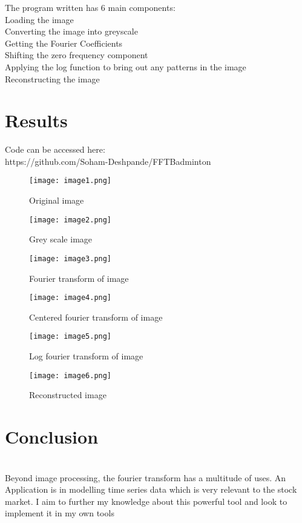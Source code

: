 \documentclass{article}
\begin{document}
The program written has 6 main components:
\\
Loading the image \\
Converting the image into greyscale
\\
Getting the Fourier Coefficients
\\
Shifting the zero frequency component
\\
Applying the log function to bring out any patterns in the image
\\
Reconstructing the image
\clearpage
\section{Results}
Code can be accessed here:
\\https://github.com/Soham-Deshpande/FFTBadminton

\begin{figure}[h]
    \centering
    \texttt{[image: image1.png]}
    \caption{Original image}
\end{figure}
\begin{figure}[h]
    \centering
    \texttt{[image: image2.png]}
    \caption{Grey scale image}
\end{figure}
\begin{figure}[h]
    \centering
    \texttt{[image: image3.png]}
    \caption{Fourier transform of image}
\end{figure}
\begin{figure}[h]
    \centering
    \texttt{[image: image4.png]}
    \caption{Centered fourier transform of image}
\end{figure}
\begin{figure}[h]
    \centering
    \texttt{[image: image5.png]}
    \caption{Log fourier transform of image}
\end{figure}
\begin{figure}[h]
    \centering
    \texttt{[image: image6.png]}
    \caption{Reconstructed image }
\end{figure}

\clearpage
\section{Conclusion}
\\
Beyond image processing, the fourier transform has a multitude of uses. An Application
is in modelling time series data which is very relevant to the stock market. I aim to further
my knowledge about this powerful tool and look to implement it in my own tools
\end{document}
